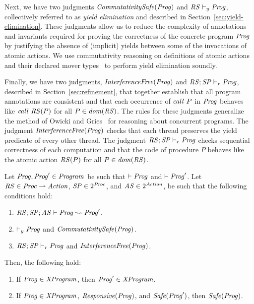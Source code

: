 Next, we have two judgments $\mathit{CommutativitySafe}(\mathit{Prog})$ and $\mathit{RS} \vdash_y \mathit{Prog}$, collectively 
referred to as {\em yield elimination\/} and described in Section~\ref{sec:yield-elimination}.
These judgments allow us to reduce the complexity of annotations and invariants 
required for proving the correctness of the concrete program $\mathit{Prog}$
by justifying the absence of (implicit) yields between some of the 
invocations of atomic actions.
We use commutativity reasoning on definitions of atomic actions and their declared mover types~\cite{FlanaganFLQ08,ElmasQT09}
to perform yield elimination soundly.

Finally, we have two judgments, $\mathit{InterferenceFree}(\mathit{Prog})$ and $\mathit{RS};\mathit{SP} \vdash_r \mathit{Prog}$,
described in Section~\ref{sec:refinement},
that together establish that all program annotations are consistent and that 
each occurrence of $\mathit{call}\ P$ in $\mathit{Prog}$ behaves like $\mathit{call}\ \mathit{RS}(P)$ 
for all $P \in \mathit{dom}(\mathit{RS})$.
The rules for these judgments generalize the method of Owicki and Gries~\cite{OwickiG76} for reasoning about concurrent programs.
The judgment $\mathit{InterferenceFree}(\mathit{Prog})$ checks that each thread preserves the
yield predicate of every other thread.
The judgment $\mathit{RS};\mathit{SP} \vdash_r \mathit{Prog}$ checks sequential correctness of each computation
and that the code of procedure $P$ behaves like the atomic action $\mathit{RS}(P)$ for all $P\in\mathit{dom}(\mathit{RS})$.

\begin{theorem}
\label{thm:correctness}
Let $\mathit{Prog}, \mathit{Prog}' \in \mathit{Program}$ be such that $\vdash \mathit{Prog}$ and $\vdash \mathit{Prog}'$.
Let $\mathit{RS} \in \mathit{Proc} \rightharpoonup \mathit{Action}$, $\mathit{SP} \in 2^{\mathit{Proc}}$, and $\mathit{AS} \in 2^{\mathit{Action}}$,
be such that the following conditions hold:
\begin{enumerate}
\item
$\mathit{RS};\mathit{SP};\mathit{AS} \vdash \mathit{Prog} \leadsto \mathit{Prog}'$.
\item
$\vdash_y \mathit{Prog}$ and $\mathit{CommutativitySafe}(\mathit{Prog})$.
\item
$\mathit{RS};\mathit{SP} \vdash_r \mathit{Prog}$ and $\mathit{InterferenceFree}(\mathit{Prog})$.
\end{enumerate}
Then, the following hold:
\begin{enumerate}
\item
If $\mathit{Prog} \in \mathit{XProgram}$, then $\mathit{Prog}' \in \mathit{XProgram}$.
\item
If $\mathit{Prog} \in \mathit{XProgram}$, $\mathit{Responsive}(\mathit{Prog})$, and $\mathit{Safe}(\mathit{Prog}')$, then $\mathit{Safe}(\mathit{Prog})$.
\end{enumerate}
\end{theorem}

